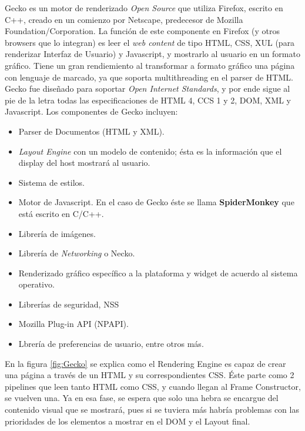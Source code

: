         Gecko es un motor de renderizado \textit{Open Source} que utiliza Firefox, escrito en C++, creado en un comienzo por Netscape, predecesor de Mozilla Foundation/Corporation. La función de este componente en Firefox (y otros browsers que lo integran) es leer el \textit{web content} de tipo HTML, CSS, XUL (para renderizar Interfaz de Usuario) y Javascript, y mostrarlo al usuario en un formato gráfico. Tiene un gran rendiemiento al transformar a formato gráfico una página con lenguaje de marcado, ya que soporta multithreading en el parser de HTML. Gecko fue diseñado para soportar \textit{Open Internet Standards}, y por ende sigue al pie de la letra todas las especificaciones de HTML 4, CCS 1 y 2, DOM, XML y Javascript. Los componentes de Gecko incluyen:
            \begin{itemize}
                \item Parser de Documentos (HTML y XML).
                \item \textit{Layout Engine} con un modelo de contenido; ésta es la información que el display del host mostrará al usuario.
                \item Sistema de estilos.
                \item Motor de Javascript. En el caso de Gecko éste se llama \textbf{SpiderMonkey} que está escrito en C/C++.
                \item Librería de imágenes.
                \item Librería de \textit{Networking} o Necko.
                \item Renderizado gráfico específico a la plataforma y widget de acuerdo al sistema operativo.
                \item Librerías de seguridad, NSS
                \item Mozilla Plug-in API (NPAPI).
                \item Lbrería de preferencias de usuario, entre otros más.

            \end{itemize}
        En la figura \ref{fig:Gecko} se explica como el Rendering Engine es capaz de crear una página a través de un HTML y su correspondientes CSS. Éste parte como 2 pipelines que leen tanto HTML como CSS, y cuando llegan al Frame Constructor, se vuelven una. Ya en esa fase, se espera que solo una hebra se encargue del contenido visual que se mostrará, pues si se tuviera más habría problemas con las prioridades de los elementos a mostrar en el DOM y el Layout final.

